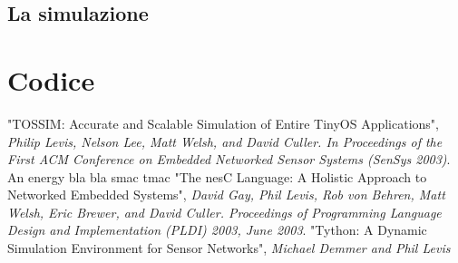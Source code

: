 \documentclass[pdftex,11pt,a4paper,italian,openany]{book}
\begin{document}
\section{La simulazione}
\chapter{Codice}
\lstset{
  basicstyle=\small,
  numbers=left, 
  stepnumber=5, 
  numbersep=8pt,
  frame=L,
  xleftmargin=10pt,
  }






\begin{thebibliography}{99}
 "TOSSIM: Accurate and Scalable Simulation of Entire TinyOS Applications", \emph{Philip Levis, Nelson Lee, Matt Welsh, and David Culler. In Proceedings of the First ACM Conference on Embedded Networked Sensor Systems (SenSys 2003)}.  
 An energy bla bla
 smac
 tmac
 "The nesC Language: A Holistic Approach to Networked Embedded Systems", \emph{David Gay, Phil Levis, Rob von Behren, Matt Welsh, Eric Brewer, and David Culler. Proceedings of Programming Language Design and Implementation (PLDI) 2003, June 2003}.
 "Tython: A Dynamic Simulation Environment for Sensor Networks", \emph{Michael Demmer and Phil Levis}
\end{thebibliography}
\end{document}
